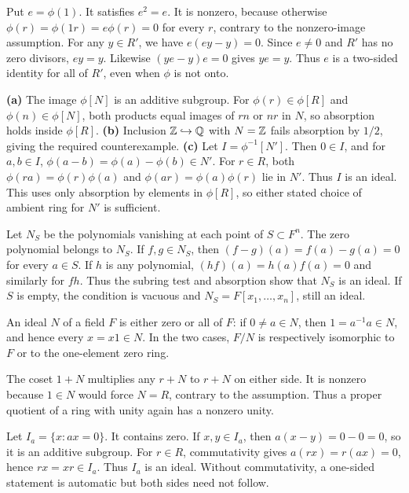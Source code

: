 Put $e=\phi(1)$. It satisfies $e^2=e$. It is nonzero, because otherwise $\phi(r)=\phi(1r)=e\phi(r)=0$ for every $r$, contrary to the nonzero-image assumption.
For any $y\in R'$, we have $e(ey-y)=0$. Since $e\ne0$ and $R'$ has no zero divisors, $ey=y$. Likewise $(ye-y)e=0$ gives $ye=y$. Thus $e$ is a two-sided identity for all of $R'$, even when $\phi$ is not onto.

\textbf{(a)} The image $\phi[N]$ is an additive subgroup. For $\phi(r)\in\phi[R]$ and $\phi(n)\in\phi[N]$, both products equal images of $rn$ or $nr$ in $N$, so absorption holds inside $\phi[R]$.
\textbf{(b)} Inclusion $\mathbb{Z}\hookrightarrow\mathbb{Q}$ with $N=\mathbb{Z}$ fails absorption by $1/2$, giving the required counterexample.
\textbf{(c)} Let $I=\phi^{-1}[N']$. Then $0\in I$, and for $a,b\in I$, $\phi(a-b)=\phi(a)-\phi(b)\in N'$. For $r\in R$, both $\phi(ra)=\phi(r)\phi(a)$ and $\phi(ar)=\phi(a)\phi(r)$ lie in $N'$. Thus $I$ is an ideal. This uses only absorption by elements in $\phi[R]$, so either stated choice of ambient ring for $N'$ is sufficient.

Let $N_S$ be the polynomials vanishing at each point of $S\subset F^n$. The zero polynomial belongs to $N_S$. If $f,g\in N_S$, then $(f-g)(a)=f(a)-g(a)=0$ for every $a\in S$. If $h$ is any polynomial, $(hf)(a)=h(a)f(a)=0$ and similarly for $fh$. Thus the subring test and absorption show that $N_S$ is an ideal. If $S$ is empty, the condition is vacuous and $N_S=F[x_1,\ldots,x_n]$, still an ideal.

An ideal $N$ of a field $F$ is either zero or all of $F$: if $0\ne a\in N$, then $1=a^{-1}a\in N$, and hence every $x=x1\in N$. In the two cases, $F/N$ is respectively isomorphic to $F$ or to the one-element zero ring.

The coset $1+N$ multiplies any $r+N$ to $r+N$ on either side. It is nonzero because $1\in N$ would force $N=R$, contrary to the assumption. Thus a proper quotient of a ring with unity again has a nonzero unity.

Let $I_a=\{x:ax=0\}$. It contains zero. If $x,y\in I_a$, then $a(x-y)=0-0=0$, so it is an additive subgroup. For $r\in R$, commutativity gives $a(rx)=r(ax)=0$, hence $rx=xr\in I_a$. Thus $I_a$ is an ideal. Without commutativity, a one-sided statement is automatic but both sides need not follow.

